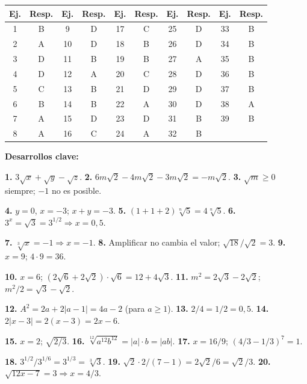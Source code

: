 \documentclass[11pt, letterpaper]{article}
\begin{document}
\begin{center}
\renewcommand{\arraystretch}{1.3}
\begin{tabular}{c|c||c|c||c|c||c|c||c|c}
\toprule
\textbf{Ej.} & \textbf{Resp.} & \textbf{Ej.} & \textbf{Resp.} & \textbf{Ej.} & \textbf{Resp.} & \textbf{Ej.} & \textbf{Resp.} & \textbf{Ej.} & \textbf{Resp.}\\
\midrule
1  & B & 9  & D & 17 & C & 25 & D & 33 & B\\
2  & A & 10 & D & 18 & B & 26 & D & 34 & B\\
3  & D & 11 & B & 19 & B & 27 & A & 35 & B\\
4  & D & 12 & A & 20 & C & 28 & D & 36 & B\\
5  & C & 13 & B & 21 & D & 29 & D & 37 & B\\
6  & B & 14 & B & 22 & A & 30 & D & 38 & A\\
7  & A & 15 & D & 23 & D & 31 & B & 39 & B\\
8  & A & 16 & C & 24 & A & 32 & B &   &  \\
\bottomrule
\end{tabular}
\end{center}

\medskip
\textbf{Desarrollos clave:}

\textbf{1.} $3\sqrt{x}+\sqrt{y}-\sqrt{z}$. \quad \textbf{2.} $6m\sqrt{2}-4m\sqrt{2}-3m\sqrt{2}=-m\sqrt{2}$. \quad \textbf{3.} $\sqrt{m}\geq0$ siempre; $-1$ no es posible.

\textbf{4.} $y=0$, $x=-3$; $x+y=-3$. \quad \textbf{5.} $(1+1+2)\sqrt[n]{5}=4\sqrt[n]{5}$. \quad \textbf{6.} $3^x=\sqrt{3}=3^{1/2}\Rightarrow x=0{,}5$.

\textbf{7.} $\sqrt[3]{x}=-1\Rightarrow x=-1$. \quad \textbf{8.} Amplificar no cambia el valor; $\sqrt{18}/\sqrt{2}=3$. \quad \textbf{9.} $x=9$; $4\cdot9=36$.

\textbf{10.} $x=6$; $(2\sqrt{6}+2\sqrt{2})\cdot\sqrt{6}=12+4\sqrt{3}$. \quad \textbf{11.} $m^2=2\sqrt{3}-2\sqrt{2}$; $m^2/2=\sqrt{3}-\sqrt{2}$.

\textbf{12.} $A^2=2a+2|a-1|=4a-2$ (para $a\geq1$). \quad \textbf{13.} $2/4=1/2=0{,}5$. \quad \textbf{14.} $2|x-3|=2(x-3)=2x-6$.

\textbf{15.} $x=2$; $\sqrt{2/3}$. \quad \textbf{16.} $\sqrt[12]{a^{12}b^{12}}=|a|\cdot b=|ab|$. \quad \textbf{17.} $x=16/9$; $(4/3-1/3)^7=1$.

\textbf{18.} $3^{1/2}/3^{1/6}=3^{1/3}=\sqrt[3]{3}$. \quad \textbf{19.} $\sqrt{2}\cdot2/(7-1)=2\sqrt{2}/6=\sqrt{2}/3$. \quad \textbf{20.} $\sqrt{12x-7}=3\Rightarrow x=4/3$.
\end{document}
